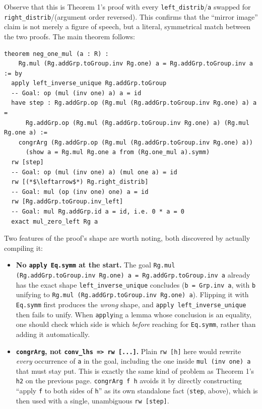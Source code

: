 Observe that this is Theorem 1's proof with every \texttt{left\_\allowbreak{}distrib}/\texttt{a} swapped for \texttt{right\_\allowbreak{}distrib}/(argument order reversed). This confirms that the ``mirror image'' claim is not merely a figure of speech, but a literal, symmetrical match between the two proofs. The main theorem follows:

\begin{lstlisting}
theorem neg_one_mul (a : R) :
    Rg.mul (Rg.addGrp.toGroup.inv Rg.one) a = Rg.addGrp.toGroup.inv a := by
  apply left_inverse_unique Rg.addGrp.toGroup
  -- Goal: op (mul (inv one) a) a = id
  have step : Rg.addGrp.op (Rg.mul (Rg.addGrp.toGroup.inv Rg.one) a) a =
      Rg.addGrp.op (Rg.mul (Rg.addGrp.toGroup.inv Rg.one) a) (Rg.mul Rg.one a) :=
    congrArg (Rg.addGrp.op (Rg.mul (Rg.addGrp.toGroup.inv Rg.one) a))
      (show a = Rg.mul Rg.one a from (Rg.one_mul a).symm)
  rw [step]
  -- Goal: op (mul (inv one) a) (mul one a) = id
  rw [(*$\leftarrow$*) Rg.right_distrib]
  -- Goal: mul (op (inv one) one) a = id
  rw [Rg.addGrp.toGroup.inv_left]
  -- Goal: mul Rg.addGrp.id a = id, i.e. 0 * a = 0
  exact mul_zero_left Rg a
\end{lstlisting}

Two features of the proof's shape are worth noting, both discovered by actually compiling it:

\begin{itemize}
\tightlist
\item
  \textbf{No \texttt{apply Eq.symm} at the start.} The goal \texttt{Rg.mul (Rg.addGrp.toGroup.inv Rg.one) a = Rg.addGrp.toGroup.inv a} already has the exact shape \texttt{left\_\allowbreak{}inverse\_\allowbreak{}unique} concludes (\texttt{b = Grp.inv a}, with \texttt{b} unifying to \texttt{Rg.mul (Rg.addGrp.toGroup.inv Rg.one) a}). Flipping it with \texttt{Eq.symm} first produces the \emph{wrong} shape, and \texttt{apply left\_\allowbreak{}inverse\_\allowbreak{}unique} then fails to unify. When \texttt{apply}ing a lemma whose conclusion is an equality, one should check which side is which \emph{before} reaching for \texttt{Eq.symm}, rather than adding it automatically.
\item
  \textbf{\texttt{congrArg}, not \texttt{conv\_\allowbreak{}lhs => rw [...]}.} Plain \texttt{rw [h]} here would rewrite \emph{every} occurrence of \texttt{a} in the goal, including the one inside \texttt{mul (inv one) a} that must stay put. This is exactly the same kind of problem as Theorem 1's \texttt{h2} on the previous page. \texttt{congrArg f h} avoids it by directly constructing ``apply \texttt{f} to both sides of \texttt{h}'' as its own standalone fact (\texttt{step}, above), which is then used with a single, unambiguous \texttt{rw [step]}.
\end{itemize}

